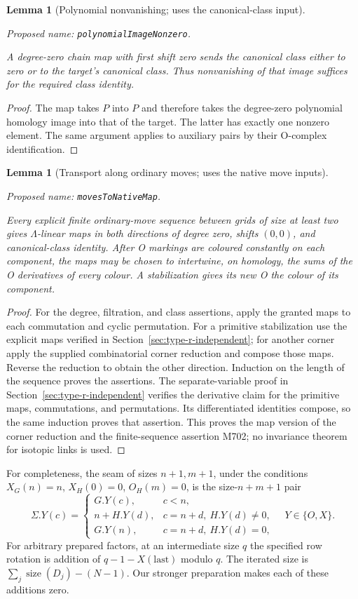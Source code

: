 \documentclass[11pt,a4paper]{article}
\newtheorem{lemma}[theorem]{Lemma}
\theoremstyle{remark}
\newcommand{\formalname}[1]{\leavevmode\par\noindent\textnormal{\small Proposed name: \texttt{#1}.}\par\smallskip}
\begin{document}
\begin{lemma}[Polynomial nonvanishing; uses the canonical-class input]
\label{lem:N}
\formalname{polynomialImageNonzero}
A degree-zero chain map with first shift zero sends the canonical
class either to zero or to the target's canonical class.  Thus
nonvanishing of that image suffices for the required class identity.
\end{lemma}
\begin{proof}
The map takes $P$ into $P$ and therefore takes the degree-zero
polynomial homology image into that of the target.  The latter has
exactly one nonzero element.  The same argument applies to auxiliary
pairs by their O-complex identification.
\end{proof}

\begin{lemma}[Transport along ordinary moves; uses the native move inputs]
\label{lem:move-transport}
\formalname{movesToNativeMap}
Every explicit finite ordinary-move sequence between grids of size
at least two gives $\Lambda$-linear maps in both directions of degree zero, shifts
$(0,0)$, and canonical-class identity.  After O markings are coloured
constantly on each component, the maps may be chosen to intertwine,
on homology, the sums of the O derivatives of every colour.  A
stabilization gives its new O the colour of its component.
\end{lemma}
\begin{proof}
For the degree, filtration, and class assertions, apply the granted
maps to each commutation and cyclic permutation.  For a primitive
stabilization use the explicit maps verified in
Section~\ref{sec:type-r-independent}; for another corner apply the
supplied combinatorial corner reduction and compose those maps.
Reverse the reduction to obtain the other direction.  Induction on
the length of the sequence proves the assertions.  The separate-variable
proof in Section~\ref{sec:type-r-independent} verifies the derivative
claim for the primitive maps, commutations, and permutations.
Its differentiated identities compose, so the same induction proves
that assertion.  This proves the map version of the corner reduction
and the finite-sequence assertion M702; no invariance theorem for
isotopic links is used.
\end{proof}

For completeness, the seam of sizes $n+1,m+1$, under the conditions
$X_G(n)=n$, $X_H(0)=0$, $O_H(m)=0$, is the size-$n+m+1$ pair
\begin{equation}\label{eq:seam-definition}
 \Sigma.Y(c)=
 \begin{cases}
   G.Y(c),&c<n,\\
   n+H.Y(d),&c=n+d,\ H.Y(d)\ne0,\\
   G.Y(n),&c=n+d,\ H.Y(d)=0,
 \end{cases}
 \quad Y\in\{O,X\}.
\end{equation}
For arbitrary prepared factors, at an intermediate size $q$ the
specified row rotation is addition of
$q-1-X(\mathrm{last})$ modulo $q$.  The iterated size is
$\sum_j\operatorname{size}(D_j)-(N-1)$.  Our stronger preparation
makes each of these additions zero.
\end{document}
